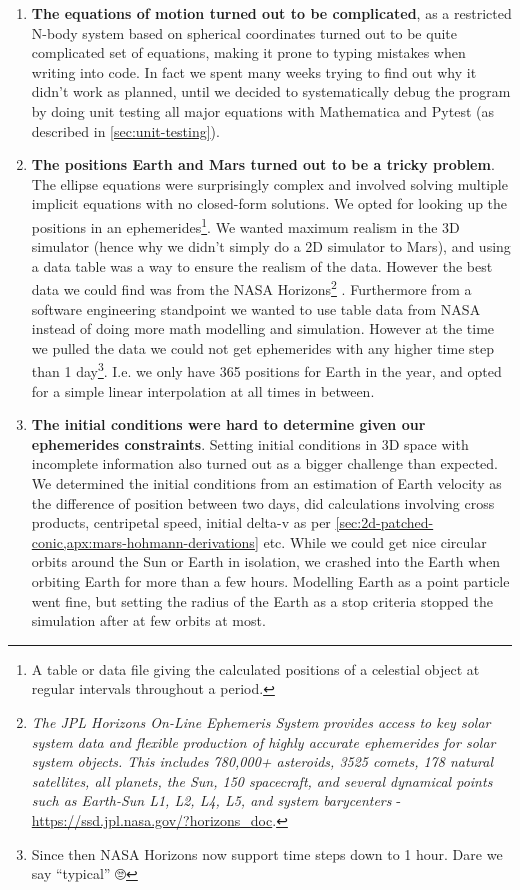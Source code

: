 \begin{enumerate}
	\item \textbf{The equations of motion turned out to be complicated}, as a restricted N-body system based on spherical coordinates turned out to be quite complicated set of equations, making it prone to typing mistakes when writing into code. In fact we spent many weeks trying to find out why it didn't work as planned, until we decided to systematically debug the program by doing unit testing all major equations with Mathematica and Pytest (as described in \cref{sec:unit-testing}).
	\item \textbf{The positions Earth and Mars turned out to be a tricky problem}. The ellipse equations were surprisingly complex and involved solving multiple implicit equations with no closed-form solutions. We opted for looking up the positions in an ephemerides\footnote{A table or data file giving the calculated positions of a celestial object at regular intervals throughout a period.}. We wanted maximum realism in the 3D simulator (hence why we didn't simply do a 2D simulator to Mars), and using a data table was a way to ensure the realism of the data. However the best data we could find was from the NASA Horizons\footnote{\textit{The JPL Horizons On-Line Ephemeris System provides access to key solar system data and flexible production of highly accurate ephemerides for solar system objects. This includes 780,000+ asteroids, 3525 comets, 178 natural satellites, all planets, the Sun, 150 spacecraft, and several dynamical points such as Earth-Sun L1, L2, L4, L5, and system barycenters} - \url{https://ssd.jpl.nasa.gov/?horizons_doc}.} \cite{NASAb}. Furthermore from a software engineering standpoint we wanted to use table data from NASA instead of doing more math modelling and simulation. However at the time we pulled the data we could not get ephemerides with any higher time step than 1 day\footnote{Since then NASA Horizons now support time steps down to 1 hour. Dare we say ``typical'' 🙄}. I.e. we only have 365 positions for Earth in the year, and opted for a simple linear interpolation at all times in between.
	\item \textbf{The initial conditions were hard to determine given our ephemerides constraints}. Setting initial conditions in 3D space with incomplete information also turned out as a bigger challenge than expected. We determined the initial conditions from an estimation of Earth velocity as the difference of position between two days, did calculations involving cross products, centripetal speed, initial delta-v as per \cref{sec:2d-patched-conic,apx:mars-hohmann-derivations} etc. While we could get nice circular orbits around the Sun or Earth in isolation, we crashed into the Earth when orbiting Earth for more than a few hours. Modelling Earth as a point particle went fine, but setting the radius of the Earth as a stop criteria stopped the simulation after at few orbits at most.
\end{enumerate}


